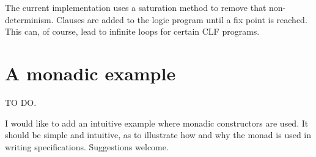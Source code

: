 \documentclass{article}
\begin{document}
The current implementation uses a saturation method to remove that
non-determinism. Clauses are added to the logic program until a fix
point is reached. This can, of course, lead to infinite loops for
certain CLF programs.



\section{A monadic example}

TO DO.

I would like to add an intuitive example where monadic constructors
are used. It should be simple and intuitive, as to illustrate how and
why the monad is used in writing specifications. Suggestions welcome.


\newpage
\end{document}
